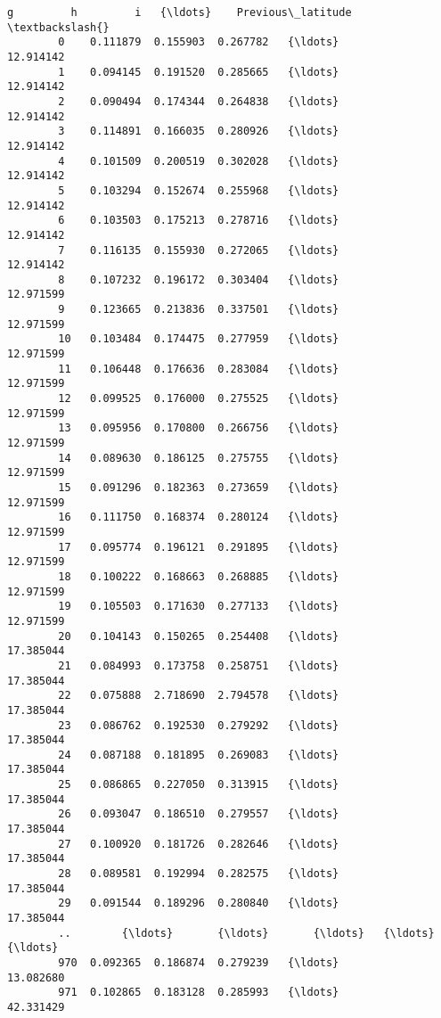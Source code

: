 \documentclass[11pt]{article}
\begin{document}
\begin{Verbatim}[commandchars=\\\{\}]
                    g         h         i   {\ldots}    Previous\_latitude  \textbackslash{}
        0    0.111879  0.155903  0.267782   {\ldots}            12.914142   
        1    0.094145  0.191520  0.285665   {\ldots}            12.914142   
        2    0.090494  0.174344  0.264838   {\ldots}            12.914142   
        3    0.114891  0.166035  0.280926   {\ldots}            12.914142   
        4    0.101509  0.200519  0.302028   {\ldots}            12.914142   
        5    0.103294  0.152674  0.255968   {\ldots}            12.914142   
        6    0.103503  0.175213  0.278716   {\ldots}            12.914142   
        7    0.116135  0.155930  0.272065   {\ldots}            12.914142   
        8    0.107232  0.196172  0.303404   {\ldots}            12.971599   
        9    0.123665  0.213836  0.337501   {\ldots}            12.971599   
        10   0.103484  0.174475  0.277959   {\ldots}            12.971599   
        11   0.106448  0.176636  0.283084   {\ldots}            12.971599   
        12   0.099525  0.176000  0.275525   {\ldots}            12.971599   
        13   0.095956  0.170800  0.266756   {\ldots}            12.971599   
        14   0.089630  0.186125  0.275755   {\ldots}            12.971599   
        15   0.091296  0.182363  0.273659   {\ldots}            12.971599   
        16   0.111750  0.168374  0.280124   {\ldots}            12.971599   
        17   0.095774  0.196121  0.291895   {\ldots}            12.971599   
        18   0.100222  0.168663  0.268885   {\ldots}            12.971599   
        19   0.105503  0.171630  0.277133   {\ldots}            12.971599   
        20   0.104143  0.150265  0.254408   {\ldots}            17.385044   
        21   0.084993  0.173758  0.258751   {\ldots}            17.385044   
        22   0.075888  2.718690  2.794578   {\ldots}            17.385044   
        23   0.086762  0.192530  0.279292   {\ldots}            17.385044   
        24   0.087188  0.181895  0.269083   {\ldots}            17.385044   
        25   0.086865  0.227050  0.313915   {\ldots}            17.385044   
        26   0.093047  0.186510  0.279557   {\ldots}            17.385044   
        27   0.100920  0.181726  0.282646   {\ldots}            17.385044   
        28   0.089581  0.192994  0.282575   {\ldots}            17.385044   
        29   0.091544  0.189296  0.280840   {\ldots}            17.385044   
        ..        {\ldots}       {\ldots}       {\ldots}   {\ldots}                  {\ldots}   
        970  0.092365  0.186874  0.279239   {\ldots}            13.082680   
        971  0.102865  0.183128  0.285993   {\ldots}            42.331429   

\end{Verbatim}
\end{document}
